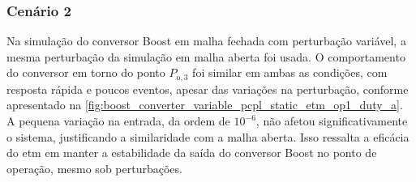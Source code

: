 \subsubsection{Cenário 2}

Na simulação do conversor Boost em malha fechada com perturbação variável, a mesma perturbação da simulação em malha aberta foi usada. O comportamento do conversor em torno do ponto $P_{\mathrm{o}, 3}$ foi similar em ambas as condições, com resposta rápida e poucos eventos, apesar das variações na perturbação, conforme apresentado na \autoref{fig:boost_converter_variable_pcpl_static_etm_op1_duty_a}. A pequena variação na entrada, da ordem de $10^{-6}$, não afetou significativamente o sistema, justificando a similaridade com a malha aberta. Isso ressalta a eficácia do \acrshort{etm} em manter a estabilidade da saída do conversor Boost no ponto de operação, mesmo sob perturbações.

